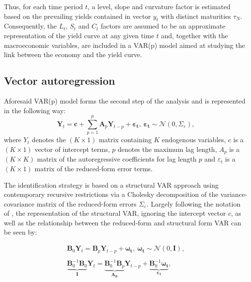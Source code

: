 Thus, for each time period $t$, a level, slope and curvature factor is estimated based on the prevailing yields contained in vector $y_{t}$ with distinct maturities $\tau_{N}$. 
Consequently, the $L_{t}$, $S_{t}$ and $C_{t}$ factors are assumed to be an approximate representation of the yield curve at any given time $t$ and, together with the macroeconomic variables, are included in a VAR(p) model aimed at studying the link between the economy and the yield curve. 

\subsection{Vector autoregression}


Aforesaid VAR(p) model forms the second step of the analysis and is represented in the following way:
\begin{equation}
\mathbf{Y}_t=\mathbf{c}+\sum_{p=1}^p 
\mathbf{A}_p \mathbf{Y}_{t-p}+\mathbf{\varepsilon_t}, \ \mathbf{\varepsilon_t} \sim \mathcal{N}\left(0, \Sigma_{\varepsilon}\right),
\end{equation}
where $Y_{t}$ denotes the $(K \times 1)$ matrix containing $K$ endogenous variables, $c$ is a $(K \times 1)$ vector of intercept terms, $p$ denotes the maximum lag length, $A_{p}$ is a $(K \times K)$ matrix of the autoregressive coefficients for lag length $p$ and $\varepsilon_{t}$ is a $(K \times 1)$ matrix of the reduced-form error terms. 

The identification strategy is based on a structural VAR approach using contemporary recursive restrictions via a Cholesky decomposition of the variance-covariance matrix of the reduced-form errors $\Sigma_{\varepsilon}$. Largely following the notation of \citet{kilian2017structural}, the representation of the structural VAR, ignoring the intercept vector $c$, as well as the relationship between the reduced-form and structural form VAR can be seen by:

\begin{equation}
\label{eq:structural_VAR}
    \begin{split}
   \mathbf{B}_{0}\mathbf{Y}_t= \mathbf{B}_p \mathbf{Y}_{t-p}+\mathbf{\omega_t}, \ \mathbf{\omega_{t}} \sim \mathcal{N}\left(0, \mathbf{I}\right), \\
   \\
    \underbrace{\mathbf{B}^{-1}_{0}\mathbf{B}_{0}}_{\mathbf{I}}\mathbf{Y}_t= \underbrace{\mathbf{B}^{-1}_{0}\mathbf{B}_p}_{\mathbf{A_p}} \mathbf{Y}_{t-p}+\underbrace{\mathbf{B}^{-1}_{0}\mathbf{\omega_t}}_{\mathbf{\varepsilon_{t}}},
    \end{split} 
\end{equation}

